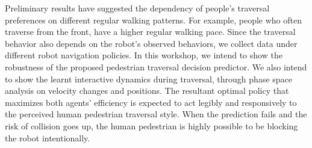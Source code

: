 \documentclass[conference]{IEEEtran}
\begin{document}
Preliminary results have suggested the dependency of people's traversal preferences 
on different regular walking patterns. For example, people who often traverse from 
the front, have a higher regular walking pace. Since the traversal 
behavior also depends on the robot's observed behaviors, we collect data under 
different robot navigation policies. In this workshop, we intend to show the 
robustness of the proposed pedestrian traversal decision predictor. We also 
intend to show the learnt interactive dynamics during traversal, through phase 
space analysis on velocity changes and positions. The resultant optimal 
policy that maximizes both agents' efficiency is expected to act legibly 
and responsively to the perceived human pedestrian traversal style. When the 
prediction fails and the risk of collision goes up, the human pedestrian is 
highly possible to be blocking the robot intentionally.

{\footnotesize


}
\end{document}
